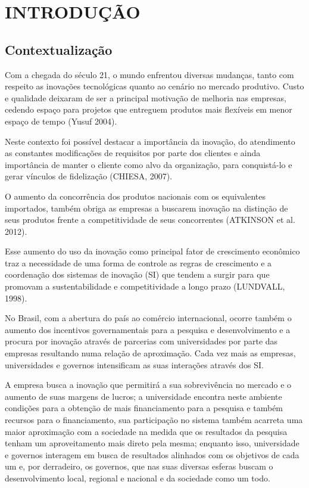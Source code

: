 \chapter{INTRODUÇÃO}
\thispagestyle{empty}

\section{Contextualização}
Com a chegada do século 21, o mundo enfrentou diversas mudanças, tanto com respeito as inovações tecnológicas quanto ao cenário no mercado produtivo. Custo e qualidade deixaram de ser a principal motivação de melhoria nas empresas, cedendo espaço para projetos que entreguem produtos mais flexíveis em menor espaço de tempo (Yusuf 2004).

Neste contexto foi possível destacar a importância da inovação, do atendimento as constantes modificações de requisitos por parte dos clientes e ainda importância de manter o cliente como alvo da organização, para conquistá-lo e gerar vínculos de fidelização (CHIESA, 2007).

O aumento da concorrência dos produtos nacionais com os equivalentes importados, também obriga as empresas a buscarem inovação na distinção de seus produtos frente a competitividade de seus concorrentes (ATKINSON et al. 2012).

Esse aumento do uso da inovação como principal fator de crescimento econômico traz a necessidade de uma forma de controle as regras de crescimento e a coordenação dos sistemas de inovação (SI) que tendem a surgir para que promovam a sustentabilidade e competitividade a longo prazo (LUNDVALL, 1998).

No Brasil, com a abertura do país ao comércio internacional, ocorre também o aumento dos incentivos governamentais para a pesquisa e desenvolvimento e a procura por inovação através de parcerias com universidades por parte das empresas resultando numa relação de aproximação. Cada vez mais as empresas, universidades e governos intensificam as suas interações através dos SI.

A empresa busca a inovação que permitirá a sua sobrevivência no mercado e o aumento de suas margens de lucros; a universidade encontra neste ambiente condições para a obtenção de mais financiamento para a pesquisa e também recursos para o financiamento, sua participação no sistema também acarreta uma maior aproximação com a sociedade na medida que os resultados da pesquisa tenham um aproveitamento mais direto pela mesma; enquanto isso, universidade e governos interagem em busca de resultados alinhados com os objetivos de cada um e, por derradeiro, os governos, que nas suas diversas esferas buscam o desenvolvimento local, regional e nacional e da sociedade como um todo.

